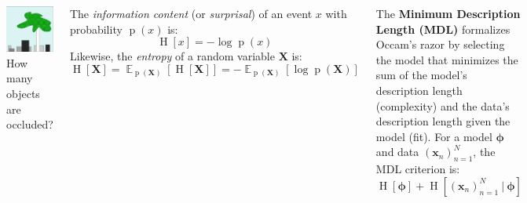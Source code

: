 \documentclass[25pt,a0paper,landscape]{tikzposter}
\DeclareMathOperator{\opExpectation}{\mathbb{E}}
\newcommand{\E}[2]{\opExpectation_{#1} \left [ #2 \right ]}
\newcommand{\MidSymbol}[1][]{\:#1\:}
\newcommand{\given}{\MidSymbol[\vert]}
\DeclareMathOperator{\opInformationContent}{H}
\newcommand{\ICof}[1]{\opInformationContent[#1]}
\DeclareMathOperator{\opEntropy}{H}
\newcommand{\Hof}[1]{\opEntropy[#1]}
\DeclareMathOperator{\opp}{p}
\newcommand{\pof}[1]{\opp(#1)}
\newcommand{\h}{\boldsymbol{\phi}}
\newcommand{\xNset}{(\x_n)_{n=1}^N}
\newcommand{\x}{\boldsymbol{x}}
\newcommand{\X}{\boldsymbol{X}}
\begin{document}
\begin{columns}
{{\begin{backgroundbox}[title={Examples {\small (left: Reddit, right: MacKay)}}]
\begin{multicols}{2}
        \includegraphics[width=\linewidth]{mackay_343_example.png}
        {\small How many objects are occluded?}
      \end{multicols}
    \end{backgroundbox}
    \begin{backgroundbox}[title=Shannon's Information Content]
      The \emph{information content} (or \emph{surprisal}) of an event $x$ with probability $\pof{x}$ is:
      \begin{equation}
        \ICof{x} = -\log \pof{x}
      \end{equation}
      Likewise, the \emph{entropy} of a random variable $\X$ is:
      \begin{equation}
        \Hof{\X} = \E{\pof{\X}}{\ICof{\X}} = -\E{\pof{\X}}{\log \pof{\X}}
      \end{equation}
    \end{backgroundbox}
    \begin{backgroundbox}[title=Minimum Description Length (MDL)/MLE/MAP]
      The \textbf{Minimum Description Length (MDL)} formalizes Occam's razor by selecting the model that minimizes the sum of the model's description length (complexity) and the data's description length given the model (fit). For a model $\h$ and data $\xNset$, the MDL criterion is:
      \begin{equation}
        \ICof{\h} + \ICof{\xNset \given \h}

\end{equation}
\end{backgroundbox}}}
\end{columns}
\end{document}
